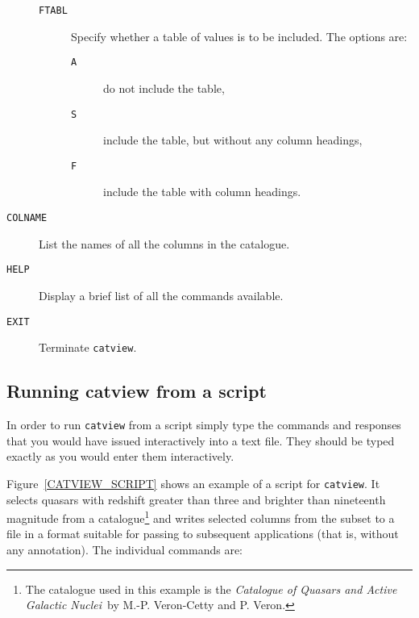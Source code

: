 \documentclass[twoside,11pt]{starlink}
\begin{document}
\begin{description}
\begin{description}
    \item[ \texttt{FTABL} ] Specify whether a table of values is to be
     included. The options are:

    \begin{description}

      \item[ \texttt{A} ] do not include the table,

      \item[ \texttt{S} ] include the table, but without any column
       headings,

      \item[ \texttt{F} ] include the table with column headings.

    \end{description}

  \end{description}


  \item[ \texttt{COLNAME} ] List the names of all the columns in the
   catalogue.

  \item[ \texttt{HELP} ] Display a brief list of all the commands
   available.

  \item[ \texttt{EXIT} ] Terminate \texttt{catview}.

\end{description}


\subsection{\label{VIEW_SCRIPT}Running catview from a script}

In order to run \texttt{catview} from a script simply type the commands and
responses that you would have issued interactively into a text file.
They should be typed exactly as you would enter them interactively.

Figure~\ref{CATVIEW_SCRIPT} shows an example of a script for \texttt{catview}. It selects quasars with redshift greater than three and
brighter than nineteenth magnitude from a catalogue\footnote{The
catalogue used in this example is the \textit{Catalogue of Quasars and Active
Galactic Nuclei}\, by M.-P. Veron-Cetty and P. Veron\cite{VERON89}.}
and writes selected columns from the subset to a file in a format suitable
for passing to subsequent applications (that is, without any annotation).
The individual commands are:
\end{document}
